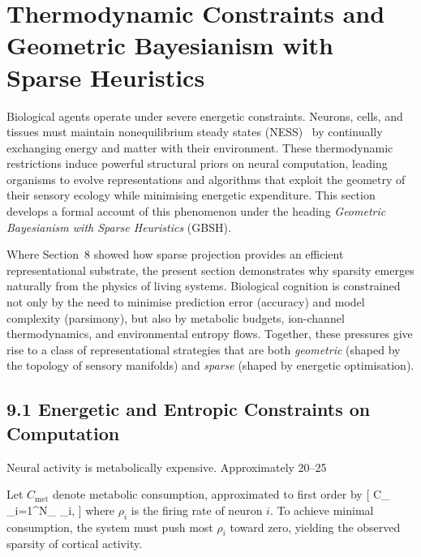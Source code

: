 \documentclass[11pt,a4paper,twoside]{article}
\begin{document}
\section{Thermodynamic Constraints and Geometric Bayesianism with Sparse Heuristics}\label{sec:thermo}

Biological agents operate under severe energetic constraints. Neurons, cells, and tissues must maintain nonequilibrium steady states (NESS)~\cite{friston2010free,friston2009free} by continually exchanging energy and matter with their environment. These thermodynamic restrictions induce powerful structural priors on neural computation, leading organisms to evolve representations and algorithms that exploit the geometry of their sensory ecology while minimising energetic expenditure. This section develops a formal account of this phenomenon under the heading \emph{Geometric Bayesianism with Sparse Heuristics} (GBSH).

Where Section~8 showed how sparse projection provides an efficient representational substrate, the present section demonstrates why sparsity emerges naturally from the physics of living systems. Biological cognition is constrained not only by the need to minimise prediction error (accuracy) and model complexity (parsimony), but also by metabolic budgets, ion-channel thermodynamics, and environmental entropy flows. Together, these pressures give rise to a class of representational strategies that are both \emph{geometric} (shaped by the topology of sensory manifolds) and \emph{sparse} (shaped by energetic optimisation).

\subsection{9.1 Energetic and Entropic Constraints on Computation}

Neural activity is metabolically expensive. Approximately 20–25%

Let $C_{\mathrm{met}}$ denote metabolic consumption, approximated to first order by
[
C_{} \propto \sum_{i=1}^{N_{}} \rho_i,
]
where $\rho_i$ is the firing rate of neuron $i$. To achieve minimal consumption, the system must push most $\rho_i$ toward zero, yielding the observed sparsity of cortical activity.
\end{document}
